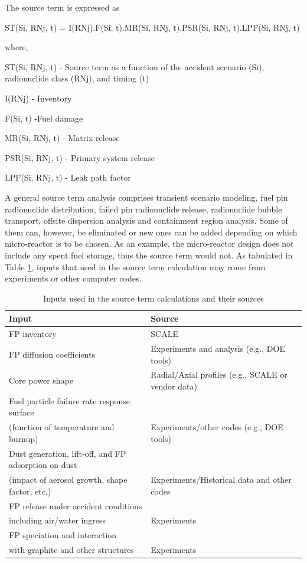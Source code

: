 \documentclass[10pt,a4paper]{article}
\begin{document}
The source term is expressed as

ST(Si, RNj, t) = I(RNj).F(Si, t).MR(Si, RNj, t).PSR(Si, RNj, t).LPF(Si, RNj, t)

where,

ST(Si, RNj, t) - Source term as a function of the accident scenario (Si), radionuclide class (RNj), and timing (t)

I(RNj) - Inventory 

F(Si, t) -Fuel damage

MR(Si, RNj, t) - Matrix release

PSR(Si, RNj, t) - Primary system release

LPF(Si, RNj, t) - Leak path factor


A general source term analysis comprises transient scenario modeling, fuel pin radionuclide distribution, failed pin radionuclide release, radionuclide bubble transport, offsite dispersion analysis and containment region analysis. Some of them can, however, be eliminated or new ones can be added depending on which micro-reactor is to be chosen. As an example, the micro-reactor design does not include any spent fuel storage, thus the source term would not. As tabulated in Table \ref{inputandsource}, inputs that used in the source term calculation may come from experiments or other computer codes. 

\begin{table} [ht]
\begin{center}

\caption{ Inputs used in the source term calculations and their sources}
\label{inputandsource}
\begin{tabular}{l l}
\hline 
Input 		&Source \\ 
\hline 
FP inventory 		&SCALE\\ 
FP diffusion coefficients 		&Experiments and analysis (e.g., DOE tools) \\ 
Core power shape		&Radial/Axial profiles (e.g., SCALE or vendor data)  \\ 
Fuel particle failure rate response surface \\
(function of temperature and burnup)	&Experiments/other codes (e.g., DOE tools) \\ 
Dust generation, lift-off, and FP adsorption on dust \\
(impact of aerosol growth, shape factor, etc.)	& Experiments/Historical data and other codes\\ 
FP release under accident conditions \\including air/water ingress 	&Experiments \\ 
FP speciation and interaction \\with graphite and other structures &Experiments  \\ 
\hline 

\end{tabular}
\end{center}
\end{table}
\end{document}
